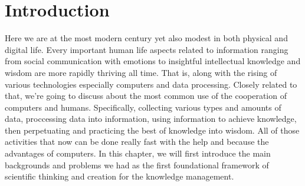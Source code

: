 \chapter{Introduction}
\label{chap:introduction}

Here we are at the most modern century yet also modest in both physical and digital life.
Every important human life aspects related to information ranging from social communication with emotions to insightful intellectual knowledge and wisdom are more rapidly thriving all time.
That is, along with the rising of various technologies especially computers and data processing.
Closely related to that, we're going to discuss about the most common use of the cooperation of computers and humans.
Specifically, collecting various types and amounts of data, proccessing data into information, using information to achieve knowledge, then perpetuating and practicing the best of knowledge into wisdom.
All of those activities that now can be done really fast with the help and because the advantages of computers.
In this chapter, we will first introduce the main backgrounds and problems we had as the first foundational framework of scientific thinking and creation for the knowledge management.
